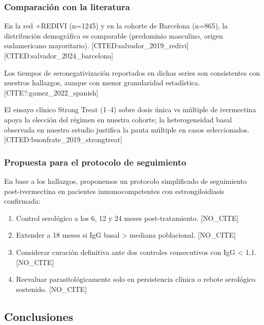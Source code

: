 \documentclass[
  spanish,
  12pt,
  a4paper,
]{article}
\providecommand{\tightlist}{%
  \setlength{\itemsep}{0pt}\setlength{\parskip}{0pt}}
\begin{document}
\subsubsection{Comparación con la
literatura}\label{comparaciuxf3n-con-la-literatura}

En la red +REDIVI (n=1245) y en la cohorte de Barcelona (n=865), la
distribución demográfica es comparable (predominio masculino, origen
sudamericano mayoritario). {[}CITED:salvador\_2019\_redivi{]}
{[}CITED:salvador\_2024\_barcelona{]}

Los tiempos de seronegativización reportados en dichas series son
consistentes con nuestros hallazgos, aunque con menor granularidad
estadística. {[}CITE?:gamez\_2022\_spanish{]}

El ensayo clínico Strong Treat (1--4) sobre dosis única vs múltiple de
ivermectina apoya la elección del régimen en nuestra cohorte; la
heterogeneidad basal observada en nuestro estudio justifica la pauta
múltiple en casos seleccionados.
{[}CITED:buonfrate\_2019\_strongtreat{]}

\subsubsection{Propuesta para el protocolo de
seguimiento}\label{propuesta-para-el-protocolo-de-seguimiento}

En base a los hallazgos, proponemos un protocolo simplificado de
seguimiento post-ivermectina en pacientes inmunocompetentes con
estrongiloidiasis confirmada:

\begin{enumerate}
\def\labelenumi{\arabic{enumi}.}
\tightlist
\item
  Control serológico a los 6, 12 y 24 meses post-tratamiento.
  {[}NO\_CITE{]}
\item
  Extender a 18 meses si IgG basal \textgreater{} mediana poblacional.
  {[}NO\_CITE{]}
\item
  Considerar curación definitiva ante dos controles consecutivos con IgG
  \textless{} 1,1. {[}NO\_CITE{]}
\item
  Reevaluar parasitológicamente solo en persistencia clínica o rebote
  serológico sostenido. {[}NO\_CITE{]}
\end{enumerate}

\subsection*{Conclusiones}\label{conclusiones}
\end{document}
